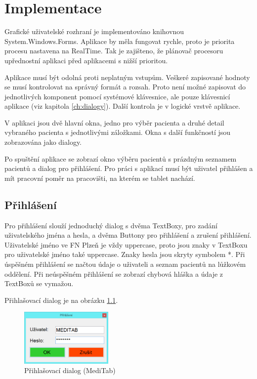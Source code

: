 \chapter{Implementace}

Grafické uživatelské rozhraní je implementováno knihovnou System.Windows.Forms. Aplikace by měla fungovat rychle, proto je priorita procesu nastavena na RealTime. Tak je zajišteno, že plánovač procesoru upřednostní aplikaci před aplikacemi s nižší prioritou.

Aplikace musí být odolná proti neplatným vstupům. Veškeré zapisované hodnoty se musí kontrolovat na správný formát a rozsah. Proto není možné zapisovat do jednotlivých komponent pomocí systémové klávesnice, ale pouze klávesnicí aplikace (viz kapitola \ref{ch:dialogy}). Další kontrola je v logické vrstvě aplikace.

V aplikaci jsou dvě hlavní okna, jedno pro výběr pacienta a druhé detail vybraného pacienta s jednotlivými záložkami. Okna s další funkčností jsou zobrazována jako dialogy.

Po spuštění aplikace se zobrazí okno výběru pacientů s prázdným seznamem pacientů a dialog pro přihlášení. Pro práci s aplikací musí být uživatel přihlášen a mít pracovní poměr na pracovišti, na kterém se tablet nachází.


\section{Přihlášení}

Pro přihlášení slouží jednoduchý dialog s dvěma TextBoxy, pro zadání uživatelského jména a hesla, a dvěma Buttony pro přihlášení a zrušení přihlášení. Uživatelské jméno ve FN Plzeň je vždy uppercase, proto jsou znaky v TextBoxu pro uživatelské jméno také uppercase. Znaky hesla jsou skryty symbolem *. Při úspěšném přihlášení se načtou údaje o uživateli a seznam pacientů na lůžkovém oddělení. Při neúspěšném přihlášení se zobrazí chybová hláška a údaje z TextBoxů se vymažou.

Přihlašovací dialog je na obrázku \ref{fig:login}.

\begin{figure}[H]
	\centering
	\includegraphics[width=0.4\textwidth]{img/meditab/login.eps}
	\caption{Přihlašovací dialog (MediTab)}
  \label{fig:login}
\end{figure}


